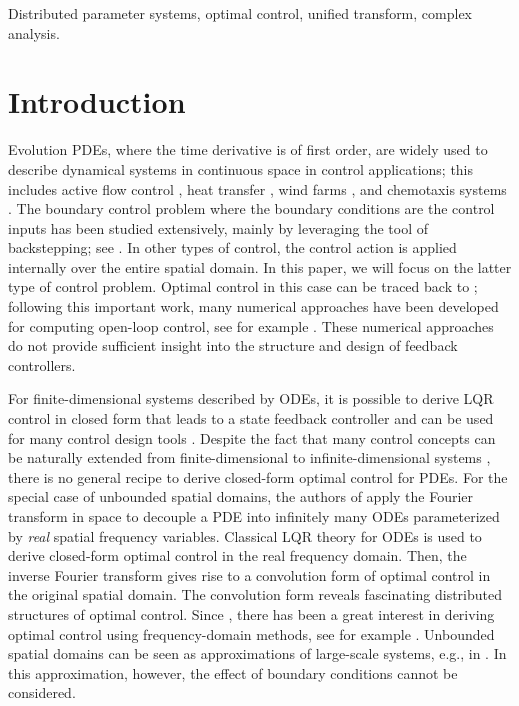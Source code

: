 \documentclass[journal,twoside,web]{ieeecolor}
\begin{document}
\begin{IEEEkeywords}
Distributed parameter systems, optimal control, unified transform, complex analysis.
\end{IEEEkeywords}

\section{Introduction}
 
Evolution PDEs, where the time derivative is of first order, are widely used to describe dynamical systems in continuous space in control applications; this includes active flow control \cite{liu2024adjoint}, heat transfer \cite{lenhart1993optimal}, wind farms \cite{shapiro2017model}, and chemotaxis systems \cite{fister2003optimal}. 
The boundary control problem where the boundary conditions are the control inputs has been studied extensively, mainly by leveraging the tool of backstepping; see \cite{smyshlyaev2010adaptive,ascencio2017backstepping}.
In other types of control, the control action is applied internally over the entire spatial domain.
In this paper, we will focus on the latter type of control problem.
Optimal control in this case can be traced back to \cite{lions1971optimal}; following this important work, many numerical approaches have been developed for computing open-loop control, see for example \cite{hinze2008optimization}.
These numerical approaches do not provide sufficient insight into the structure and design of feedback controllers.

For finite-dimensional systems described by ODEs, it is possible to derive LQR control in closed form that leads to a state feedback controller and can be used for many control design tools \cite{anderson2007optimal}.
Despite the fact that many control concepts can be naturally extended from finite-dimensional to infinite-dimensional systems \cite{curtain2012introduction}, there is no general recipe to derive closed-form optimal control for PDEs.
For the special case of unbounded spatial domains, the authors of \cite{bamieh2002distributed} apply the Fourier transform in space to decouple a PDE into infinitely many ODEs parameterized by \emph{real} spatial frequency variables.
Classical LQR theory for ODEs is used to derive closed-form optimal control in the real frequency domain.
Then, the inverse Fourier transform gives rise to a convolution form of optimal control in the original spatial domain.
The convolution form reveals fascinating distributed structures of optimal control. Since \cite{bamieh2002distributed}, there has been a great interest in deriving optimal control using frequency-domain methods, see for example \cite{d2003distributed,motee2008optimal}. 
Unbounded spatial domains can be seen as approximations of large-scale systems, e.g., in \cite{jovanovic2005ill}. In this approximation, however, the effect of boundary conditions cannot be considered. 
\end{document}
